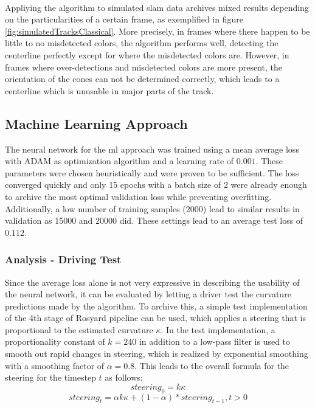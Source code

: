 \\Appliying the algorithm to simulated \ac{slam} data archives mixed results depending on the particularities of a certain frame, as exemplified in figure \ref{fig:simulatedTracksClassical}. More precisely, in frames where there happen to be little to no misdetected colors, the algorithm performs well, detecting the centerline perfectly except for where the misdetected colors are. However, in frames where over-detections and misdetected colors are more present, the orientation of the cones can not be determined correctly, which leads to a centerline which is unusable in major parts of the track. 

\subsection{Machine Learning Approach}
The neural network for the \ac{ml} approach was trained using a mean average loss with ADAM as optimization algorithm and a learning rate of $0.001$. These parameters were chosen heuristically and were proven to be sufficient. The loss converged quickly and only 15 epochs with a batch size of 2 were already enough to archive the most optimal validation loss while preventing overfitting. Additionally, a low number of training samples (2000) lead to similar results in validation as 15000 and 20000 did. These settings lead to an average test loss of $0.112$.

\subsubsection{Analysis - Driving Test}
Since the average loss alone is not very expressive in describing the usability of the neural network, it can be evaluated by letting a driver test the curvature predictions made by the algorithm. To archive this, a simple test implementation of the 4th stage of Rosyard pipeline can be used, which applies a steering that is proportional to the estimated curvature $\kappa$. In the test implementation, a proportionality constant of $k = 240$ in addition to a low-pass filter is used to smooth out rapid changes in steering, which is realized by exponential smoothing with a smoothing factor of $\alpha = 0.8$. This leads to the overall formula for the steering for the timestep $t$ as follows:\\
$$steering_0= k\kappa$$
$$steering_t= \alpha k\kappa + (1-\alpha)*steering_{t-1}, t > 0$$ 


